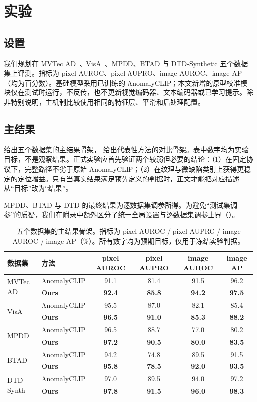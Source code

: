 \section{实验}
\label{sec:experiments}

\subsection{设置}
我们规划在 MVTec AD~\cite{bergmann2019mvtec}、VisA~\cite{zou2022visa}、MPDD、BTAD 与 DTD-Synthetic 五个数据集上评测。指标为 pixel AUROC、pixel AUPRO、image AUROC、image AP（均为百分数）。基础模型采用已训练的 AnomalyCLIP；本文新增的原型校准模块仅在测试时运行，不反传，也不更新视觉编码器、文本编码器或已学习提示。除非特别说明，主机制比较使用相同的特征层、平滑和后处理配置。

\subsection{主结果}
 给出五个数据集的主结果骨架， 给出代表性方法的对比骨架。表中数字均为实验目标，不是观察结果。正式实验应首先验证两个较弱但必要的结论：（1）在固定协议下，完整路径不劣于原始 AnomalyCLIP；（2）在纹理与微缺陷类别上获得更稳定的定位增益。只有当真实结果满足预先定义的判据时，正文才能把对应描述从“目标”改为“结果”。

MPDD、BTAD 与 DTD 的最终结果为逐数据集调参所得。为避免“测试集调参”的质疑，我们在附录中额外区分了统一全局设置与逐数据集调参上界（）。

\begin{table}[t]
\centering
\caption{五个数据集的主结果骨架。指标为 pixel AUROC / pixel AUPRO / image AUROC / image AP（\%）。所有数字均为预期目标，仅用于冻结实验判据。}
\label{tab:main}
\small
\begin{tabular}{llcccc}
\toprule
数据集 & 方法 & pixel AUROC & pixel AUPRO & image AUROC & image AP \\
\midrule
\multirow{2}{*}{MVTec AD} & AnomalyCLIP & 91.1 & 81.4 & 91.5 & 96.2 \\
 & \textbf{Ours} & \textbf{92.4} & \textbf{85.8} & \textbf{94.2} & \textbf{97.5} \\
\midrule
\multirow{2}{*}{VisA} & AnomalyCLIP & 95.5 & 87.0 & 82.1 & 85.4 \\
 & \textbf{Ours} & \textbf{96.5} & \textbf{91.0} & \textbf{85.3} & \textbf{88.2} \\
\midrule
\multirow{2}{*}{MPDD} & AnomalyCLIP & 96.5 & 88.7 & 77.0 & 80.2 \\
 & \textbf{Ours} & \textbf{97.2} & \textbf{90.5} & \textbf{80.0} & \textbf{83.5} \\
\midrule
\multirow{2}{*}{BTAD} & AnomalyCLIP & 94.2 & 74.8 & 89.5 & 91.5 \\
 & \textbf{Ours} & \textbf{95.8} & \textbf{78.5} & \textbf{92.0} & \textbf{93.5} \\
\midrule
\multirow{2}{*}{DTD-Synth} & AnomalyCLIP & 97.0 & 89.5 & 94.0 & 97.2 \\
 & \textbf{Ours} & \textbf{97.8} & \textbf{91.5} & \textbf{96.0} & \textbf{98.3} \\
\bottomrule
\end{tabular}
\end{table}

